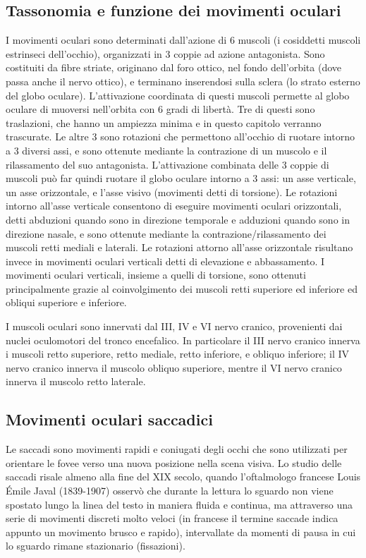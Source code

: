 \documentclass[12pt]{article}
\begin{document}
\subsection{Tassonomia e funzione dei movimenti oculari}
I movimenti oculari sono determinati dall'azione di 6 muscoli (i cosiddetti muscoli estrinseci dell'occhio), organizzati in 3 coppie ad azione antagonista. Sono costituiti da fibre striate, originano dal foro ottico, nel fondo dell'orbita (dove passa anche il nervo ottico), e terminano inserendosi sulla sclera (lo strato esterno del globo oculare). L'attivazione coordinata di questi muscoli permette al globo oculare di muoversi nell'orbita con 6 gradi di libertà. Tre di questi sono traslazioni, che hanno un ampiezza minima e in questo capitolo verranno trascurate. Le altre 3 sono rotazioni che permettono all'occhio di ruotare intorno a 3 diversi assi, e sono ottenute mediante la contrazione di un muscolo e il rilassamento del suo antagonista. L'attivazione combinata delle 3 coppie di muscoli può far quindi ruotare il globo oculare intorno a 3 assi: un asse verticale, un asse orizzontale, e l'asse visivo (movimenti detti di torsione). Le rotazioni intorno all'asse verticale consentono di eseguire movimenti oculari orizzontali, detti abduzioni quando sono in direzione temporale e adduzioni quando sono in direzione nasale, e sono ottenute mediante la contrazione/rilassamento dei muscoli retti mediali e laterali. Le rotazioni attorno all'asse orizzontale risultano invece in movimenti oculari verticali detti di elevazione e abbassamento. I movimenti oculari verticali, insieme a quelli di torsione, sono ottenuti principalmente grazie al coinvolgimento dei muscoli retti superiore ed inferiore ed obliqui superiore e inferiore. 

I muscoli oculari sono innervati dal III, IV e VI nervo cranico, provenienti dai nuclei oculomotori del tronco encefalico. In particolare il III nervo cranico innerva i muscoli retto superiore, retto mediale, retto inferiore, e obliquo inferiore; il IV nervo cranico innerva il muscolo obliquo superiore, mentre il VI nervo cranico innerva il muscolo retto laterale.

\subsection{Movimenti oculari saccadici}
Le saccadi sono movimenti rapidi e coniugati degli occhi che sono utilizzati per orientare le fovee verso una nuova posizione nella scena visiva. Lo studio delle saccadi risale almeno alla fine del XIX secolo, quando l'oftalmologo francese Louis Émile Javal (1839-1907) osservò che durante la lettura lo sguardo non viene spostato lungo la linea del testo in maniera fluida e continua, ma attraverso una serie di movimenti discreti molto veloci (in francese il termine saccade indica appunto un movimento brusco e rapido), intervallate da momenti di pausa in cui lo sguardo rimane stazionario (fissazioni).
\end{document}
